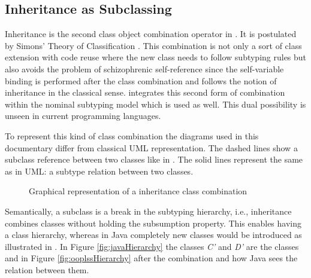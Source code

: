 %
%

\subsection{Inheritance as Subclassing}
Inheritance is the second class object combination operator in
\ooplss. It is postulated by Simons' Theory of Classification
\cite{simons_theory_2004-2}. This combination is not only a sort of class
extension with code reuse where the new class needs to follow subtyping
rules but also avoids the problem of schizophrenic self-reference since
the self-variable binding is performed after the class combination
and follows the notion of inheritance in the classical sense. \ooplss
integrates this second form of combination within the nominal subtyping
model which is used as well. This dual possibility is unseen in current
programming languages.

To represent this kind of class combination the diagrams used in
this documentary differ from classical UML representation. The
dashed lines show a subclass reference between two classes like in
. The solid lines represent the same as
in UML: a subtype relation between two classes.

\begin{figure}
	\centering
	\caption{Graphical representation of a inheritance class combination}
	\label{fig:subclassCombination}
\end{figure}

Semantically, a subclass is a break in the subtyping hierarchy,
i.e., inheritance combines classes without holding the subsumption
property. This enables \ooplss having a class hierarchy,
whereas in Java completely new classes would be introduced as illustrated
in . In Figure \ref{fig:javaHierarchy} the
classes \emph{C'} and \emph{D'} are the classes \C and \D in Figure
\ref{fig:ooplssHierarchy} after the combination and how Java sees the
relation between them.

